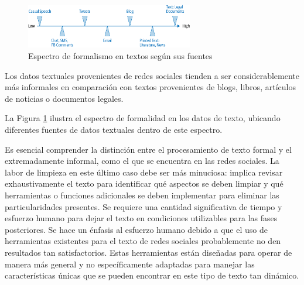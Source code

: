 \begin{figure}
	\includegraphics[width=0.65\textwidth]{capitulo3/figuras/nlp7.png}
	\caption{Espectro de formalismo en textos según sus fuentes}
	\label{fig:nlp7}
\end{figure}

Los datos textuales provenientes de redes sociales tienden a ser considerablemente más informales en comparación con textos provenientes de blogs, libros, artículos de noticias o documentos legales.

 La Figura \ref{fig:nlp7} ilustra el espectro de formalidad en los datos de texto, ubicando diferentes fuentes de datos textuales dentro de este espectro.



Es esencial comprender la distinción entre el procesamiento de texto formal y el extremadamente informal, como el que se encuentra en las redes sociales. La labor de limpieza en este último caso debe ser más minuciosa: implica revisar exhaustivamente el texto para identificar qué aspectos se deben limpiar y qué herramientas o funciones adicionales se deben implementar para eliminar las particularidades presentes. Se requiere una cantidad significativa de tiempo y esfuerzo humano para dejar el texto en condiciones utilizables para las fases posteriores. Se hace un énfasis al esfuerzo humano debido a que el uso de herramientas existentes para el texto de redes sociales probablemente no den resultados tan satisfactorios. Estas herramientas están diseñadas para operar de manera más general y no específicamente adaptadas para manejar las características únicas que se pueden encontrar en este tipo de texto tan dinámico.